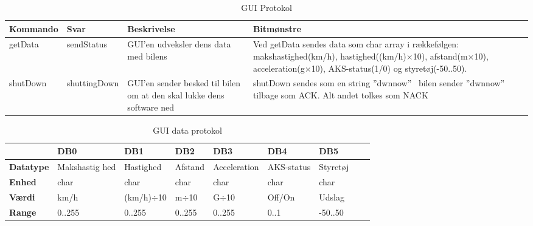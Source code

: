 \begin{table}[ht]
	\begin{tabularx}{\textwidth}{| Z | Z | Z | Z |} \hline

		\textbf{Kommando} 						&
		\textbf{Svar}							&
		\textbf{Beskrivelse}					&
		\textbf{Bitmønstre}						\\ \hline

		getData 	&
		sendStatus 	&
		GUI'en udveksler dens data med bilens 	&
		Ved getData sendes data som char array i rækkefølgen: makshastighed(km/h), hastighed((km/h)$\times$10), afstand(m$\times$10), acceleration(g$\times$10), AKS-status(1/0) og styretøj(-50..50). \\ \hline

		shutDown 	&
		shuttingDown &
		GUI'en sender besked til bilen om at den skal lukke dens software ned &
		shutDown sendes som en string ''dwnnow'' \
bilen sender ''dwnnow'' tilbage som ACK. Alt andet tolkes som NACK \\ \hline

		\end{tabularx}
	\caption{GUI Protokol}
	\label{tbl:prt_gui}
\end{table}



\begin{table}[ht]
	\begin{tabularx}{\textwidth}{| Z | Z | Z | Z | Z | Z | Z | Z | Z |} \hline

	\textbf{}	&
	\textbf{DB0}	&
	\textbf{DB1}	&
	\textbf{DB2}	&
	\textbf{DB3}	&
	\textbf{DB4}	&
	\textbf{DB5}	\\ \hline

	\textbf{Datatype} & Makshastig hed & Hastighed & Afstand & Acceleration & AKS-status & Styretøj \\ \hline
	\textbf{Enhed} & char & char & char & char & char &  char \\ \hline
	\textbf{Værdi} & km/h & (km/h)$\div$10 & m$\div$10 & G$\div$10 & Off/On & Udslag \\ \hline
	\textbf{Range} & 0..255 & 0..255 & 0..255 & 0..255 & 0..1 & -50..50 \\ \hline
	
	\end{tabularx}
	\caption{GUI data protokol}
	\label{tbl:prt_gui_byte}
\end{table}

